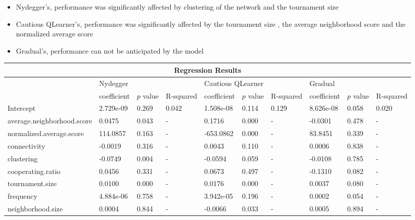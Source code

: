 \begin{itemize}
	\item Nydegger's, performance was significantly affected by clustering of the network
	      and the tournament size
	\item Cautious QLearner's, performance was significantly affected by the tournament size
	      , the average neighborhood score and the normalized average score
	\item Gradual's, performance can not be anticipated by the model
\end{itemize}

\begin{table}[!hbtp]
	\centering
	\begin{adjustbox}{width=0.7\textwidth}
		\small
		\begin{tabular}{|l|l|l|l|l|l|l|l|l|l|}
			\hline
			\multicolumn{10}{|c|}{Regression Results}                                                                       \\ \hline
			& \multicolumn{3}{l|}{Nydegger} & \multicolumn{3}{l|}{Cautious QLearner} & \multicolumn{3}{l|}{Gradual} \\ \hline
			                           & coefficient & \(p\) value & R-squared & coefficient & \(p\) value & R-squared & coefficient & \(p\) value & R-squared \\ \hline

			Intercept                  & 2.729e-09   & 0.269       & 0.042     & 1.508e-08   & 0.114       & 0.129     & 8.626e-08   & 0.058       & 0.020     \\ \hline
			average.neighborhood.score & 0.0475      & 0.043       & -         & 0.1716      & 0.000       & -         & -0.0301     & 0.478       & -         \\ \hline
			normalized.average.score   & 114.0857    & 0.163       & -         & -653.0862   & 0.000       & -         & 83.8451     & 0.339       & -         \\ \hline
			connectivity               & -0.0019     & 0.316       & -         & 0.0043      & 0.110       & -         & 0.0006      & 0.838       & -         \\ \hline
			clustering                 & -0.0749     & 0.004       & -         & -0.0594     & 0.059       & -         & -0.0108     & 0.785       & -         \\ \hline
			cooperating.ratio          & 0.0456      & 0.331       & -         & 0.0673      & 0.497       & -         & -0.1310     & 0.082       & -         \\ \hline
			tournament.size            & 0.0100      & 0.000       & -         & 0.0176      & 0.000       & -         & 0.0037      & 0.080       & -         \\ \hline
			frequency                  & 4.884e-06   & 0.758       & -         & 3.942e-05   & 0.196       & -         & 0.0002      & 0.054       & -         \\ \hline
			neighborhood.size          & 0.0004      & 0.844       & -         & -0.0066     & 0.033       & -         & 0.0005      & 0.894       & -         \\ \hline


\end{tabular}
\end{adjustbox}
\end{table}
